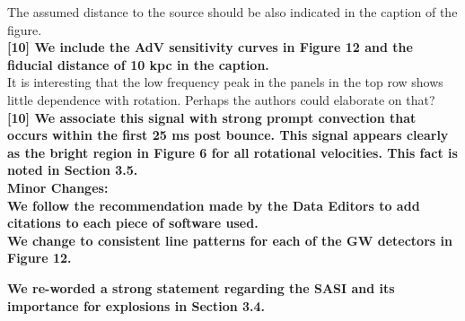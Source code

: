 \documentclass[11pt]{article}
\begin{document}
The assumed distance to the source should be also indicated in the caption of the 
figure.\\

\textbf{[10] We include the AdV sensitivity curves in Figure 12 and the fiducial distance of 10 kpc in the caption.}\\

It is interesting that the low frequency peak in the panels in the top row shows 
little dependence with rotation. Perhaps the authors could elaborate on that?\\

\textbf{[10] We associate this signal with strong prompt convection that occurs within the first 25 ms post bounce.  This signal appears clearly as the bright region in Figure 6 for all rotational velocities.  This fact is noted in Section 3.5.}\\

\textbf{Minor Changes:}\\

\textbf{We follow the recommendation made by the Data Editors to add citations to each piece of software used.}\\

\textbf{We change to consistent line patterns for each of the GW detectors in Figure 12.}

\textbf{We re-worded a strong statement regarding the SASI and its importance for explosions in Section 3.4.}

% 
%
% 
%
% 

\newpage

\setcounter{page}{1}  \renewcommand{\thepage}
           {Bibliography -- \arabic{page}}

\renewcommand\bibsection{\section*{References}}
\setlength{\bibsep}{2pt}

\end{document}
